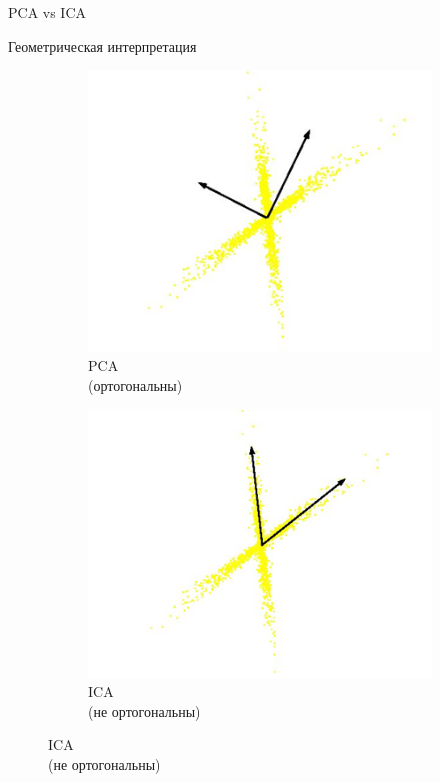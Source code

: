 \documentclass[10pt]{beamer}
\begin{document}
\begin{frame}{PCA vs ICA}
    \begin{block}{Геометрическая интерпретация}
        \begin{figure}
            \begin{subfigure}[b]{0.45\textwidth}
            \includegraphics[scale=0.5]{images/pcadirections.png}
            \caption{PCA\\(ортогональны)}
            \end{subfigure}
            \begin{subfigure}[b]{0.45\textwidth}
                \includegraphics[scale=0.5]{images/icadirections.png}
                \caption{ICA\\(не ортогональны)}
            \end{subfigure}
        \end{figure}
    \end{block}
\end{frame}
\end{document}

